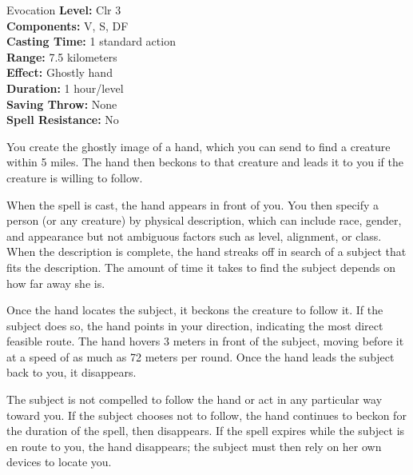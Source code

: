 {Evocation}
{
	\textbf{Level:}
	Clr 3\\
	\textbf{Components:}
	V, S, DF\\
	\textbf{Casting Time:}
	1 standard action\\
	\textbf{Range:}
	7.5 kilometers\\
	\textbf{Effect:}
	Ghostly hand\\
	\textbf{Duration:}
	1 hour/level\\
	\textbf{Saving Throw:}
	None\\
	\textbf{Spell Resistance:}
	No\\
}
{
	You create the ghostly image of a hand, which you can send to find a creature within 5 miles. The hand then beckons to that creature and leads it to you if the creature is willing to follow.


	When the spell is cast, the hand appears in front of you. You then specify a person (or any creature) by physical description, which can include race, gender, and appearance but not ambiguous factors such as level, alignment, or class. When the description is complete, the hand streaks off in search of a subject that fits the description. The amount of time it takes to find the subject depends on how far away she is.

	Once the hand locates the subject, it beckons the creature to follow it. If the subject does so, the hand points in your direction, indicating the most direct feasible route. The hand hovers 3 meters in front of the subject, moving before it at a speed of as much as 72 meters per round. Once the hand leads the subject back to you, it disappears.

	The subject is not compelled to follow the hand or act in any particular way toward you. If the subject chooses not to follow, the hand continues to beckon for the duration of the spell, then disappears. If the spell expires while the subject is en route to you, the hand disappears; the subject must then rely on her own devices to locate you.

}
